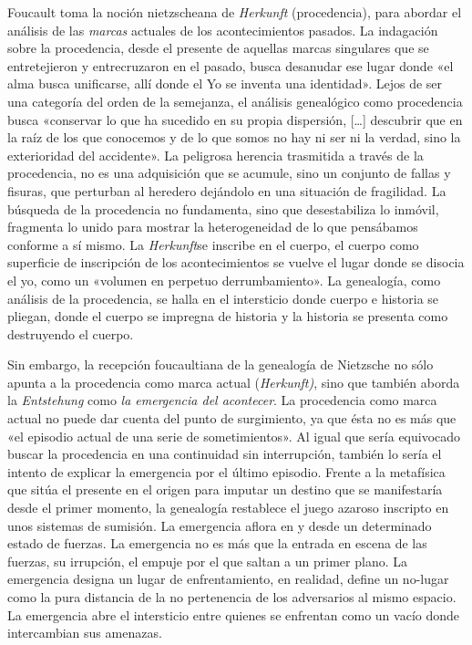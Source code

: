 Foucault toma la noción nietzscheana de \emph{Herkunft} (procedencia), para abordar el análisis de las \emph{marcas} actuales de los acontecimientos pasados. La indagación sobre la procedencia, desde el presente de aquellas marcas singulares que se entretejieron y entrecruzaron en el pasado, busca desanudar ese lugar donde «el alma busca unificarse, allí donde el Yo se inventa una identidad». Lejos de ser una categoría del orden de la semejanza, el análisis genealógico como procedencia busca «conservar lo que ha sucedido en su propia dispersión, {[}\ldots{]} descubrir que en la raíz de los que conocemos y de lo que somos no hay ni ser ni la verdad, sino la exterioridad del accidente». La peligrosa herencia trasmitida a través de la procedencia, no es una adquisición que se acumule, sino un conjunto de fallas y fisuras, que perturban al heredero dejándolo en una situación de fragilidad. La búsqueda de la procedencia no fundamenta, sino que desestabiliza lo inmóvil, fragmenta lo unido para mostrar la heterogeneidad de lo que pensábamos conforme a sí mismo. La \emph{Herkunft}se inscribe en el cuerpo, el cuerpo como superficie de inscripción de los acontecimientos se vuelve el lugar donde se disocia el yo, como un «volumen en perpetuo derrumbamiento». La genealogía, como análisis de la procedencia, se halla en el intersticio donde cuerpo e historia se pliegan, donde el cuerpo se impregna de historia y la historia se presenta como destruyendo el cuerpo.

Sin embargo, la recepción foucaultiana de la genealogía de Nietzsche no sólo apunta a la procedencia como marca actual (\emph{Herkunft)}, sino que también aborda la \emph{Entstehung} como \emph{la emergencia del acontecer}. La procedencia como marca actual no puede dar cuenta del punto de surgimiento, ya que ésta no es más que «el episodio actual de una serie de sometimientos». Al igual que sería equivocado buscar la procedencia en una continuidad sin interrupción, también lo sería el intento de explicar la emergencia por el último episodio. Frente a la metafísica que sitúa el presente en el origen para imputar un destino que se manifestaría desde el primer momento, la genealogía restablece el juego azaroso inscripto en unos sistemas de sumisión. La emergencia aflora en y desde un determinado estado de fuerzas. La emergencia no es más que la entrada en escena de las fuerzas, su irrupción, el empuje por el que saltan a un primer plano. La emergencia designa un lugar de enfrentamiento, en realidad, define un no-lugar como la pura distancia de la no pertenencia de los adversarios al mismo espacio. La emergencia abre el intersticio entre quienes se enfrentan como un vacío donde intercambian sus amenazas.

